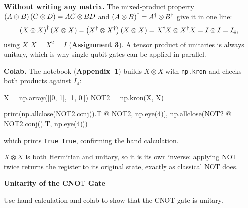 \documentclass[a4paper, 10pt]{article}
\begin{document}
\begin{solution}
	\noindent \textbf{Without writing any matrix.} The mixed-product property \( \left(A \otimes B\right)\left(C \otimes D\right) = AC \otimes BD \) and \( \left(A \otimes B\right)^{\dagger} = A^{\dagger} \otimes B^{\dagger} \) give it in one line:
	\[
		\left(X \otimes X\right)^{\dagger}\left(X \otimes X\right)
		= \left(X^{\dagger} \otimes X^{\dagger}\right)\left(X \otimes X\right)
		= X^{\dagger}X \otimes X^{\dagger}X
		= I \otimes I = I_4 ,
	\]
	using \( X^{\dagger}X = X^2 = I \) (\textbf{Assignment 3}). A tensor product of unitaries is always unitary, which is why single-qubit gates can be applied in parallel.

	\noindent \textbf{Colab.} The notebook (\textbf{Appendix~1}) builds \( X \otimes X \) with \texttt{np.kron} and checks both products against \( I_4 \):
	\begin{codingbox*}
X = np.array([[0, 1], [1, 0]])
NOT2 = np.kron(X, X)

print(np.allclose(NOT2.conj().T @ NOT2, np.eye(4)),
      np.allclose(NOT2 @ NOT2.conj().T, np.eye(4)))
\end{codingbox*}
	\noindent which prints \texttt{True True}, confirming the hand calculation.

	\begin{remark}
		\( X \otimes X \) is both Hermitian and unitary, so it is its own inverse: applying NOT twice returns the register to its original state, exactly as classical NOT does.
	\end{remark}
\end{solution}

\newpage

\begin{problem}
\textbf{Unitarity of the CNOT Gate}
\par Use hand calculation and colab to show that the CNOT gate is unitary.
\end{problem}
\end{document}
